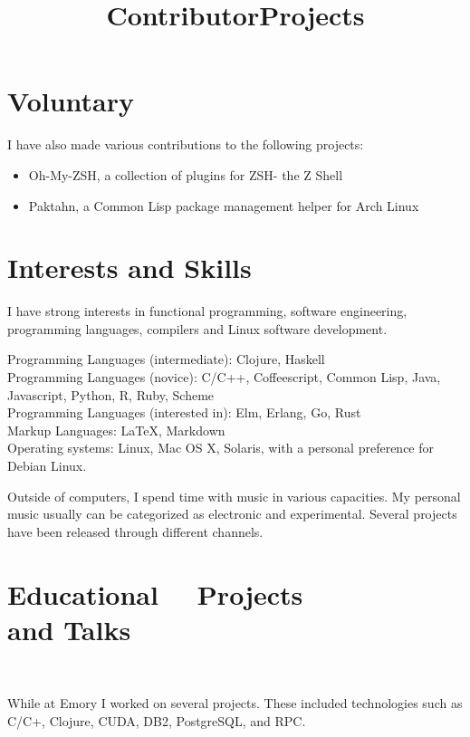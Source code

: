 \documentclass[margintitle,line]{res}
\renewcommand{\subsection}[1]{\section{\normalfont #1}}
\begin{document}
\begin{resume}
\subsection{Voluntary}

\title{Contributor}
\begin{position}
I have also made various contributions to the following projects:
\begin{itemize}
\item{Oh-My-ZSH, a collection of plugins for ZSH- the Z Shell}
\item{Paktahn, a Common Lisp package management helper for Arch Linux}
\end{itemize}
\end{position}


\section{Interests and Skills}

I have strong interests in functional programming, software engineering, programming languages, compilers and Linux software development.

Programming Languages (intermediate): Clojure, Haskell \\
Programming Languages (novice): C/C++, Coffeescript, Common Lisp, Java, Javascript, Python, R, Ruby, Scheme \\
Programming Languages (interested in): Elm, Erlang, Go, Rust \\
Markup Languages: LaTeX, Markdown \\
Operating systems: Linux, Mac OS X, Solaris, with a personal preference for Debian Linux.

Outside of computers, I spend time with music in various capacities. My personal music usually can be categorized as electronic and experimental. Several projects have been released through different channels.


\section{Educational \ \ Projects \\ and Talks}
\ \\

\title{Projects}
\begin{position}
While at Emory I worked on several projects. These included technologies such as C/C+, Clojure, CUDA, DB2, PostgreSQL, and RPC.
\end{position}


\end{resume}
\end{document}
